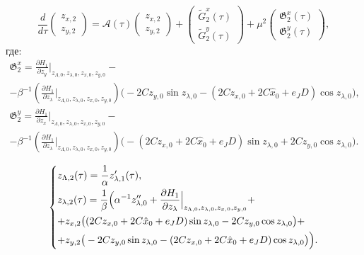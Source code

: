 \begin{equation}
\frac{d}{d\tau} \begin{pmatrix} z_{x,2} \\ z_{y,2} \end{pmatrix} = 
\mathcal{A}(\tau) \begin{pmatrix} z_{x,2} \\ z_{y,2} \end{pmatrix} + \begin{pmatrix} \tilde G_2^x(\tau) \\ \tilde G_2^y(\tau) \end{pmatrix} + 
\mu^2 \begin{pmatrix} 
\mathfrak{G}_2^x(\tau) \\ 
\mathfrak{G}_2^y(\tau)
\end{pmatrix},
\label{xy_eq_new}
\end{equation}
где:
\begin{multline*}
\mathfrak{G}_2^x = \frac{\partial H_1}{\partial z_y} \Big|_{z_{\Lambda,0},z_{\lambda,0},z_{x,0},z_{y,0}} - \\ -\beta^{-1} \left(\frac{\partial H_1}{\partial z_\lambda} \Big|_{z_{\Lambda,0},z_{\lambda,0},z_{x,0},z_{y,0}} \right) \big( -2Cz_{y,0} \sin z_{\lambda,0} - (2C z_{x,0}+2C \hat x_0+e_JD) \cos z_{\lambda,0} \big),
\end{multline*}
\begin{multline*}
\mathfrak{G}_2^y = \frac{\partial H_1}{\partial z_x} \Big|_{z_{\Lambda,0},z_{\lambda,0},z_{x,0},z_{y,0}} - \\ -\beta^{-1} \left(\frac{\partial H_1}{\partial z_\lambda} \Big|_{z_{\Lambda,0},z_{\lambda,0},z_{x,0},z_{y,0}} \right) \big( -(2C z_{x,0}+2C \hat x_0+e_JD) \sin z_{\lambda,0} + 2C z_{y,0} \cos z_{\lambda,0} \big).
\end{multline*}

\begin{equation*}
    \begin{dcases}
        z_{\Lambda,2}(\tau) = \frac{1}{\alpha} z_{\lambda,1}'(\tau), \\
        z_{\lambda,2}(\tau) = \frac1\beta \Big( \alpha^{-1} z_{\lambda,0}'' 
         + \frac{\partial H_1}{\partial z_\lambda} \Big|_{z_{\Lambda,0},z_{\lambda,0},z_{x,0},z_{y,0}} + \\ +z_{x,2} \big( (2C z_{x,0}+2C \hat x_0+e_JD) \sin z_{\lambda,0} - 2C z_{y,0} \cos z_{\lambda,0} \big) + \\
+ z_{y,2} \big( -2C z_{y,0} \sin z_{\lambda,0} - (2C z_{x,0}+2C \hat x_0+e_JD) \cos z_{\lambda,0} \big) \Big).\\
    \end{dcases}
\end{equation*}

